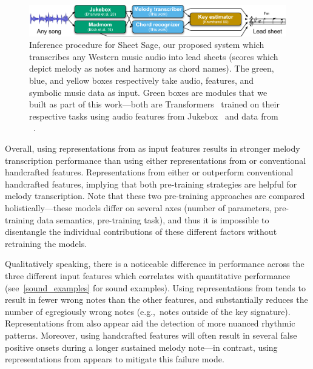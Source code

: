 \begin{figure}
    \centering
    \includegraphics[width=\linewidth]{figs/sheetsage.pdf}
    \caption{
    Inference procedure for Sheet Sage, our proposed system which transcribes any Western music audio into lead sheets (scores which depict melody as notes and harmony as chord names). The green, blue, and yellow boxes respectively take audio, features, and symbolic music data as input. Green boxes are modules that we built as part of this work---both are Transformers~\cite{vaswani2017attention} trained on their respective tasks using audio features from Jukebox~\cite{dhariwal2020jukebox} and data from \hooktheory~\cite{hooktheory}.}
    \label{fig:sheet_sage}
\end{figure}

Overall, using representations from \jukebox{} as input features results in stronger melody transcription performance than using either representations from \mtthree{} or conventional handcrafted features. 
Representations from either \mtthree{} or \jukebox{} outperform conventional handcrafted features, 
implying that both pre-training strategies are helpful for melody transcription. 
Note that these two pre-training approaches are compared holistically---these models differ on several axes 
(number of parameters, 
pre-training data semantics, 
pre-training task), 
and thus it is impossible to disentangle the individual contributions of these different factors without retraining the models. 

Qualitatively speaking, there is a noticeable difference in performance across the three different input features which correlates with quantitative performance (see~\cref{sound_examples} for sound examples). 
Using representations from \jukebox{} tends to result in fewer wrong notes than the other features, and substantially reduces the number of egregiously wrong notes (e.g.,~notes outside of the key signature). 
Representations from \jukebox{} also appear aid the detection of more nuanced rhythmic patterns. 
Moreover, using handcrafted features will often result in several false positive onsets during a longer sustained melody note---in contrast, using representations from \jukebox{} appears to mitigate this failure mode.

